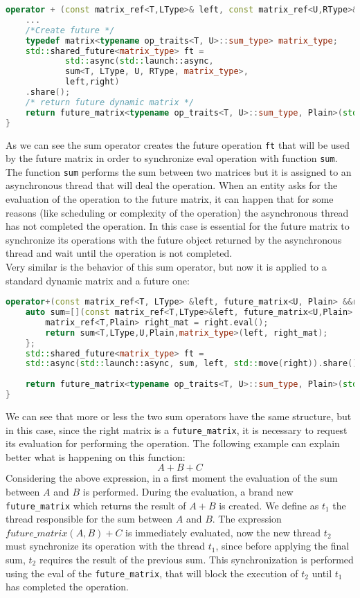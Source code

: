 \documentclass[11pt,a4paper]{article}
\begin{document}
\begin{lstlisting}[language= C++]
operator + (const matrix_ref<T,LType>& left, const matrix_ref<U,RType>& right) {
	...
	/*Create future */
	typedef matrix<typename op_traits<T, U>::sum_type> matrix_type;
	std::shared_future<matrix_type> ft = 
			std::async(std::launch::async, 
			sum<T, LType, U, RType, matrix_type>,
			left,right)
	.share();
	/* return future dynamic matrix */
	return future_matrix<typename op_traits<T, U>::sum_type, Plain>(std::move(ft), left.get_height(), left.get_width());
}
\end{lstlisting}
As we can see the sum operator creates the future operation \verb|ft| that will be used by the future matrix in order to synchronize eval operation with function \verb|sum|. The function \verb|sum| performs the sum between two matrices but it is assigned to an asynchronous thread that will deal the operation. When an entity asks for the evaluation of the operation to the future matrix, it can happen that for some reasons (like scheduling or complexity of the operation) the asynchronous thread has not completed the operation. In this case is essential for the future matrix to synchronize its operations with the future object returned by the asynchronous thread and wait until the operation is not completed.\\
Very similar is the behavior of this sum operator, but now it is applied to a standard dynamic matrix and a future one:
\begin{lstlisting}[language=C++]
operator+(const matrix_ref<T, LType> &left, future_matrix<U, Plain> &&right) {
	auto sum=[](const matrix_ref<T,LType>&left, future_matrix<U,Plain> &&right){
		matrix_ref<T,Plain> right_mat = right.eval();
		return sum<T,LType,U,Plain,matrix_type>(left, right_mat);
	};
	std::shared_future<matrix_type> ft = 
	std::async(std::launch::async, sum, left, std::move(right)).share();
	
	return future_matrix<typename op_traits<T, U>::sum_type, Plain>(std::move(ft), left.get_height(), left.get_width());
}
\end{lstlisting}
We can see that more or less the two sum operators have the same structure, but in this case, since the right matrix is a \verb|future_matrix|, it is necessary to request its evaluation for performing the operation. The following example can explain better what is happening on this function:
$$A + B + C$$
Considering the above expression, in a first moment the evaluation of the sum between $A$ and $B$ is performed. During the evaluation, a brand new \verb|future_matrix| which returns the result of $A+B$ is created. We define as $t_1$ the thread responsible for the sum between $A$ and $B$. The expression $future\_matrix(A,B) + C$ is immediately evaluated, now the new thread $t_2$ must synchronize its operation with the thread $t_1$, since before applying the final sum, $t_2$ requires the result of the previous sum. This synchronization is performed using the eval of the \verb|future_matrix|, that will block the execution of $t_2$ until $t_1$ has completed the operation.\\
\end{document}

